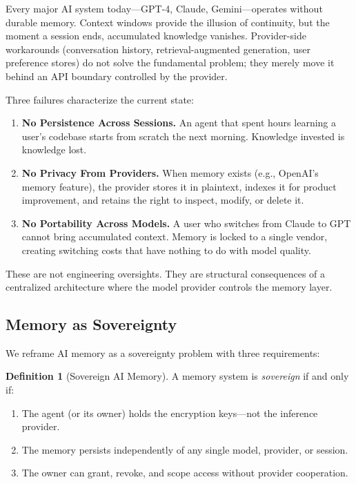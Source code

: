 \documentclass[11pt,letterpaper]{article}
\theoremstyle{definition}
\newtheorem{definition}{Definition}
\theoremstyle{remark}
\begin{document}
Every major AI system today---GPT-4, Claude, Gemini---operates without durable memory. Context windows provide the illusion of continuity, but the moment a session ends, accumulated knowledge vanishes. Provider-side workarounds (conversation history, retrieval-augmented generation, user preference stores) do not solve the fundamental problem; they merely move it behind an API boundary controlled by the provider.

Three failures characterize the current state:

\begin{enumerate}
    \item \textbf{No Persistence Across Sessions.} An agent that spent hours learning a user's codebase starts from scratch the next morning. Knowledge invested is knowledge lost.
    \item \textbf{No Privacy From Providers.} When memory exists (e.g., OpenAI's memory feature), the provider stores it in plaintext, indexes it for product improvement, and retains the right to inspect, modify, or delete it.
    \item \textbf{No Portability Across Models.} A user who switches from Claude to GPT cannot bring accumulated context. Memory is locked to a single vendor, creating switching costs that have nothing to do with model quality.
\end{enumerate}

These are not engineering oversights. They are structural consequences of a centralized architecture where the model provider controls the memory layer.

\subsection{Memory as Sovereignty}

We reframe AI memory as a sovereignty problem with three requirements:

\begin{definition}[Sovereign AI Memory]
A memory system is \emph{sovereign} if and only if:
\begin{enumerate}
    \item The agent (or its owner) holds the encryption keys---not the inference provider.
    \item The memory persists independently of any single model, provider, or session.
    \item The owner can grant, revoke, and scope access without provider cooperation.
\end{enumerate}
\end{definition}
\end{document}
